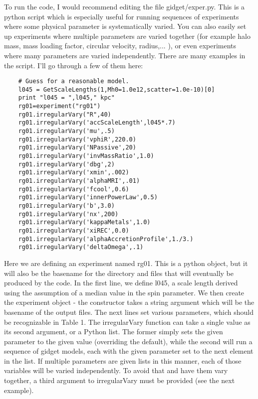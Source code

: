 \documentclass[11pt]{amsart}
\begin{document}
To run the code, I would recommend editing the file gidget/exper.py. This is a python script which is especially useful for running sequences of experiments where some physical parameter is systematically varied. You can also easily set up experiments where multiple parameters are varied together (for example halo mass, mass loading factor, circular velocity, radius,... ), or even experiments where many parameters are varied independently. There are many examples in the script. I'll go through a few of them here:
\begin{lstlisting}
    # Guess for a reasonable model.
    l045 = GetScaleLengths(1,Mh0=1.0e12,scatter=1.0e-10)[0]
    print "l045 = ",l045," kpc"
    rg01=experiment("rg01")
    rg01.irregularVary("R",40)
    rg01.irregularVary('accScaleLength',l045*.7)
    rg01.irregularVary('mu',.5)
    rg01.irregularVary('vphiR',220.0)
    rg01.irregularVary('NPassive',20)
    rg01.irregularVary('invMassRatio',1.0)
    rg01.irregularVary('dbg',2)
    rg01.irregularVary('xmin',.002)
    rg01.irregularVary('alphaMRI',.01)
    rg01.irregularVary('fcool',0.6)
    rg01.irregularVary('innerPowerLaw',0.5)
    rg01.irregularVary('b',3.0)
    rg01.irregularVary('nx',200)
    rg01.irregularVary('kappaMetals',1.0)
    rg01.irregularVary('xiREC',0.0)
    rg01.irregularVary('alphaAccretionProfile',1./3.)
    rg01.irregularVary('deltaOmega',.1)
\end{lstlisting}
Here we are defining an experiment named rg01. This is a python object, but it will also be the basename for the directory and files that will eventually be produced by the code. In the first line, we define l045, a scale length derived using the assumption of a median value in the spin parameter. We then create the experiment object - the constructor takes a string argument which will be the basename of the output files. The next lines set various parameters, which should be recognizable in Table 1. The irregularVary function can take a single value as its second argument, or a Python list. The former simply sets the given parameter to the given value (overriding the default), while the second will run a sequence of gidget models, each with the given parameter set to the next element in the list. If multiple parameters are given lists in this manner, each of those variables will be varied independently. To avoid that and have them vary together, a third argument to irregularVary must be provided (see the next example).
\end{document}
